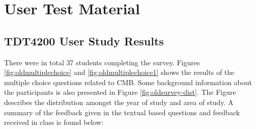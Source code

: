 \chapter{User Test Material}
\label{apdx:usertest}

\section{TDT4200 User Study Results}
There were in total 37 students completing the survey. Figures \ref{fig:oldmultiplechoice} and \ref{fig:oldmultiplechoice1} shows the results of the multiple choice questions related to CMB. Some background information about the participants is also presented in Figure \ref{fig:oldsurvey-dist}. The Figure describes the distribution amongst the year of study and area of study. A summary of the feedback given in the textual based questions and feedback received in class is found below:

